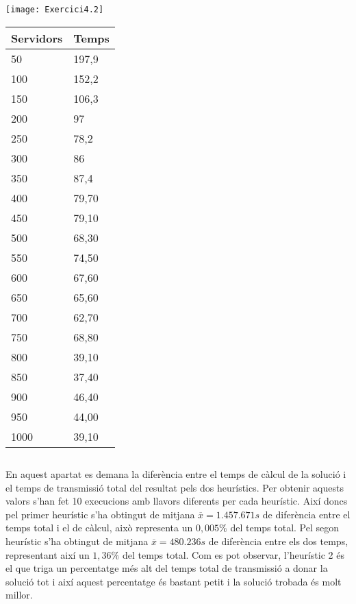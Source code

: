 \documentclass[a4paper, 12pt]{article}
\begin{document}
\vspace{1cm}

\begin{minipage}[b]{\linewidth}
	\begin{minipage}[b]{0.69\linewidth}
		\texttt{[image: Exercici4.2]}
	\end{minipage}
	\hfill
	\begin{minipage}[b]{0.3\linewidth}
		\scriptsize
		\begin{tabular}{l | l}
			Servidors & Temps \\
			\hline
			50	& 197,9 \\
			100	& 152,2 \\
			150	& 106,3 \\
			200	& 97 \\
			250	& 78,2 \\
			300	& 86 \\
			350	& 87,4 \\
			400	& 79,70 \\
			450	& 79,10 \\
			500	& 68,30 \\
			550	& 74,50 \\
			600	& 67,60 \\
			650	& 65,60 \\
			700	& 62,70 \\
			750	& 68,80 \\
			800	& 39,10 \\
			850	& 37,40 \\
			900	& 46,40 \\
			950	& 44,00 \\
			1000	& 39,10 \\
		\end{tabular}
	\end{minipage}
\end{minipage}

\subsection{}
En aquest apartat es demana la diferència entre el temps de càlcul de la solució i el temps de 
transmissió total del resultat pels dos heurístics. Per obtenir aquests valors s'han fet 10
execucions amb llavors diferents per cada heurístic.
Així doncs pel primer heurístic s'ha obtingut de mitjana $\overline{x} = 1.457.671 s$ de diferència
entre el temps total i el de càlcul, això representa un $0,005\%$ del temps total. Pel segon
heurístic s'ha obtingut de mitjana $\overline{x} = 480.236 s$ de diferència entre els dos temps,
representant així un $1,36\%$ del temps total.
Com es pot observar, l'heurístic 2 és el que triga un percentatge més alt del temps total de transmissió
a donar la solució tot i així aquest percentatge és bastant petit i la solució trobada és molt millor.
\end{document}

